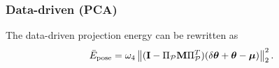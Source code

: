 \subsubsection*{Data-driven (PCA)} 
The data-driven projection energy can be rewritten as
\begin{equation*}
\bar{E}_{\text{pose}}  = \omega_4 \left\Vert {(\mathbf{I}  - \Pi_{\mathcal{P}}\mathbf{M}\Pi_{\mathcal{P}}^T)(\delta{\boldsymbol{\theta}} + \boldsymbol{\theta}- \boldsymbol{\mu}) } \right\Vert_2^2.
\end{equation*}
%
%
\vspace{-.3in}
